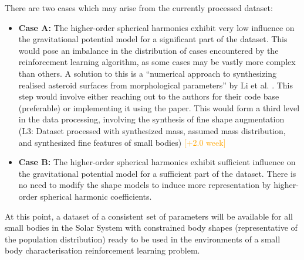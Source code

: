 \begin{enumerate}
    There are two cases which may arise from the currently processed dataset:
    \begin{itemize}
        \item \textbf{Case A:} The higher-order spherical harmonics exhibit very low influence on the gravitational potential model for a significant part of the dataset. This would pose an imbalance in the distribution of cases encountered by the reinforcement learning algorithm, as some cases may be vastly more complex than others. A solution to this is a ``numerical approach to synthesizing realised asteroid surfaces from morphological parameters'' by Li et al. \cite{Li2022}. This step would involve either reaching out to the authors for their code base (preferable) or implementing it using the paper. This would form a third level in the data processing, involving the synthesis of fine shape augmentation (L3: Dataset processed with synthesized mass, assumed mass distribution, and synthesized fine features of small bodies) \textcolor{orange}{[+2.0 week]}
        \item \textbf{Case B:} The higher-order spherical harmonics exhibit sufficient influence on the gravitational potential model for a sufficient part of the dataset. There is no need to modify the shape models to induce more representation by higher-order spherical harmonic coefficients.
    \end{itemize}

    At this point, a dataset of a consistent set of parameters will be available for all small bodies in the Solar System with constrained body shapes (representative of the population distribution) ready to be used in the environments of a small body characterisation reinforcement learning problem.


\end{enumerate}
